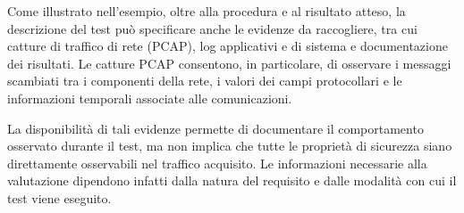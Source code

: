Come illustrato nell'esempio, oltre alla procedura e al risultato atteso, la descrizione del test può specificare anche le evidenze da raccogliere, tra cui catture di traffico di rete (PCAP), log applicativi e di sistema e documentazione dei risultati. Le catture PCAP consentono, in particolare, di osservare i messaggi scambiati tra i componenti della rete, i valori dei campi protocollari e le informazioni temporali associate alle comunicazioni.

La disponibilità di tali evidenze permette di documentare il comportamento osservato durante il test, ma non implica che tutte le proprietà di sicurezza siano direttamente osservabili nel traffico acquisito. Le informazioni necessarie alla valutazione dipendono infatti dalla natura del requisito e dalle modalità con cui il test viene eseguito.
